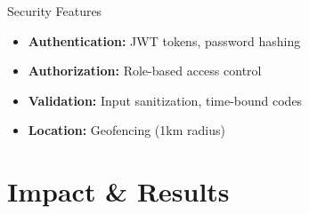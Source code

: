 \documentclass[aspectratio=169]{beamer}
\begin{document}
\begin{frame}{Security Features}
    \begin{itemize}
        \item \textbf{Authentication:} JWT tokens, password hashing
        \item \textbf{Authorization:} Role-based access control
        \item \textbf{Validation:} Input sanitization, time-bound codes
        \item \textbf{Location:} Geofencing (1km radius)
    \end{itemize}
    
    \vspace{2em}
    
    \begin{center}
    \end{center}
\end{frame}

\section{Impact \& Results}
\end{document}
